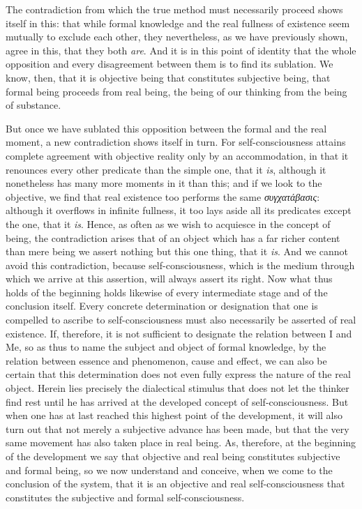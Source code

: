 \documentclass[12pt]{book}
\newcommand{\opage}[1]{\marginnote{\footnotesize\textit{[#1]}}}
\begin{document}
\opage{37} The contradiction from which the true method must necessarily
proceed shows itself in this: that while formal knowledge and the real fullness
of existence seem mutually to exclude each other, they nevertheless, as we have
previously shown, agree in this, that they both \emph{are}. And it is in this
point of identity that the whole opposition and every disagreement between them
is to find its sublation. We know, then, that it is objective being that
constitutes subjective being, that formal being proceeds from real being, the
being of our thinking from the being of substance.

But once we have sublated this opposition between the formal and the real
moment, a new contradiction shows itself in turn. For self-consciousness
attains complete agreement with objective reality only by an accommodation, in
that it renounces every other predicate than the simple one, that it \emph{is},
although it nonetheless has many more moments in it than this; and if we look
to the objective, we find that real existence too performs the same
\textit{συγχατάβασις}: although it overflows in infinite fullness, it too lays
aside all its predicates except the one, that it \emph{is}. Hence, as often as
we wish to acquiesce in the concept of being, the contradiction arises that of
an object which has a far richer content than mere being we assert nothing but
this one thing, that it \emph{is}. And we cannot avoid this contradiction,
because self-consciousness, which is the medium through which we arrive at this
assertion, will always assert its right. Now what thus holds of the beginning
holds likewise of every intermediate stage and of the conclusion itself. Every
concrete determination or designation that one is compelled to ascribe to
self-consciousness must also necessarily be asserted of real existence. If,
therefore, it is not sufficient to designate the relation
\opage{38} between I and Me, so as thus to name the subject and object of
formal knowledge, by the relation between essence and phenomenon, cause and
effect, we can also be certain that this determination does not even fully
express the nature of the real object. Herein lies precisely the dialectical
stimulus that does not let the thinker find rest until he has arrived at the
developed concept of self-consciousness. But when one has at last reached this
highest point of the development, it will also turn out that not merely a
subjective advance has been made, but that the very same movement has also
taken place in real being. As, therefore, at the beginning of the development
we say that objective and real being constitutes subjective and formal being,
so we now understand and conceive, when we come to the conclusion of the
system, that it is an objective and real self-consciousness that constitutes
the subjective and formal self-consciousness.
\end{document}
